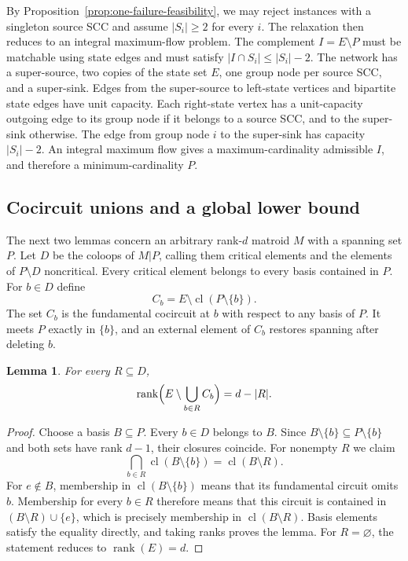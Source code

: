 \documentclass[11pt]{article}
\newtheorem{lemma}[theorem]{Lemma}
\theoremstyle{definition}
\theoremstyle{remark}\newtheorem{remark}[theorem]{Remark}
\DeclareMathOperator{\rk}{rank}
\DeclareMathOperator{\cl}{cl}
\begin{document}
By Proposition~\ref{prop:one-failure-feasibility}, we may reject
instances with a singleton source SCC and assume $|S_i|\ge2$ for every $i$. The relaxation then
reduces to an integral maximum-flow problem.
The complement $I=E\setminus P$
must be matchable using state edges and must satisfy
$|I\cap S_i|\le |S_i|-2$. The network has a super-source, two copies of the state set $E$, one group
node per source SCC, and a super-sink. Edges from the super-source to
left-state vertices and bipartite state edges have unit capacity.
Each right-state vertex has a unit-capacity outgoing edge to its group
node if it belongs to a source SCC, and to the super-sink otherwise.
The edge from group node $i$ to the super-sink has capacity
$|S_i|-2$. An integral maximum flow gives a maximum-cardinality admissible
$I$, and therefore a minimum-cardinality $P$.



\subsection{Cocircuit unions and a global lower bound}
The next two lemmas concern an arbitrary rank-$d$ matroid $M$ with a
spanning set $P$. Let $D$ be the coloops of $M|P$, calling them
critical elements and the elements of $P\setminus D$ noncritical.
Every critical element belongs to every basis contained in $P$.
For $b\in D$ define
\[
 C_b=E\setminus\cl(P\setminus\{b\}).
\]
The set $C_b$ is the fundamental cocircuit at $b$ with respect to
any basis of $P$. It meets $P$ exactly in $\{b\}$, and an external
element of $C_b$ restores spanning after deleting $b$.

\begin{lemma}\label{lem:union-rank}
For every $R\subseteq D$,
\[
 \rk\Bigl(E\setminus\bigcup_{b\in R}C_b\Bigr)=d-|R|.
\]
\end{lemma}
\begin{proof}
Choose a basis $B\subseteq P$. Every $b\in D$ belongs to $B$.
Since $B\setminus\{b\}\subseteq P\setminus\{b\}$ and both sets have
rank $d-1$, their closures coincide. For nonempty $R$ we claim
\[
 \bigcap_{b\in R}\cl(B\setminus\{b\})=\cl(B\setminus R).
\]
For $e\notin B$, membership in $\cl(B\setminus\{b\})$ means that its
fundamental circuit omits $b$. Membership for every $b\in R$ therefore
means that this circuit is contained in $(B\setminus R)\cup\{e\}$,
which is precisely membership in $\cl(B\setminus R)$. Basis elements
satisfy the equality directly, and taking ranks proves the lemma. For $R=\varnothing$, the
statement reduces to $\rk(E)=d$.
\end{proof}
\end{document}
